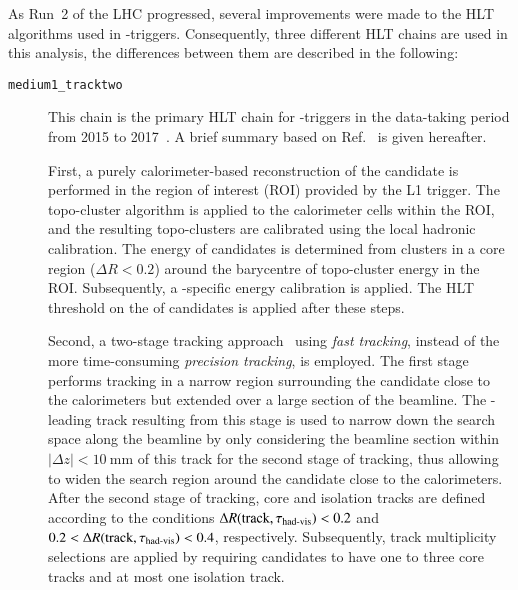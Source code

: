 As Run~2 of the LHC progressed, several improvements were made to the HLT
algorithms used in \tauhadvis-triggers. Consequently, three different HLT chains
are used in this analysis, the differences between them are described in the
following:
\begin{description}

\item[\texttt{medium1\_tracktwo}] This chain is the primary HLT chain for
  \tauhadvis-triggers in the data-taking period from 2015 to
  2017~\cite{ATL-DAQ-PUB-2016-001,ATL-DAQ-PUB-2017-001,ATL-DAQ-PUB-2018-002}. A
  brief summary based on Ref.~\cite{ATLAS-CONF-2017-061} is given hereafter.

  First, a purely calorimeter-based reconstruction of the \tauhadvis candidate
  is performed in the region of interest (ROI) provided by the L1 trigger. The
  topo-cluster algorithm is applied to the calorimeter cells within the ROI, and
  the resulting topo-clusters are calibrated using the local hadronic
  calibration. The energy of \tauhadvis candidates is determined from clusters
  in a core region ($\Delta R < 0.2$) around the barycentre of topo-cluster
  energy in the ROI. Subsequently, a \tauhadvis-specific energy calibration is
  applied.
  The HLT threshold on the \pT of \tauhadvis candidates is applied after these
  steps.

  Second, a two-stage tracking approach~\cite{TRIG-2016-01,ATLAS-CONF-2017-061}
  using \emph{fast tracking}, instead of the more time-consuming \emph{precision
    tracking}, is employed. The first stage performs tracking in a narrow region
  surrounding the \tauhadvis candidate close to the calorimeters but extended
  over a large section of the beamline. The \pT-leading track resulting from
  this stage is used to narrow down the search space along the beamline by only
  considering the beamline section within $|\Delta z| < \SI{10}{\milli\metre}$
  of this track for the second stage of tracking, thus allowing to widen the
  search region around the \tauhadvis candidate close to the calorimeters. After
  the second stage of tracking, core and isolation tracks are defined according
  to the conditions $\Delta R(\text{track}, \tau_{\text{had-vis}}) < 0.2$ and
  $0.2 < \Delta R(\text{track}, \tau_{\text{had-vis}}) < 0.4$, respectively. Subsequently,
  track multiplicity selections are applied by requiring \tauhadvis candidates
  to have one to three core tracks and at most one isolation track.


\end{description}
